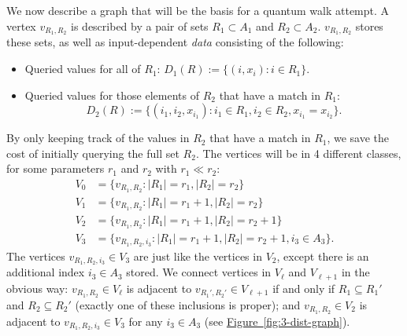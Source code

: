 \documentclass{article}
\newcommand{\fig}[1]{\hyperref[fig:#1]{Figure~\ref*{fig:#1}}}
\renewcommand{\>}{\rangle}
\newcommand{\<}{\langle}
\renewcommand{\(}{\left(}
\renewcommand{\)}{\right)}
\begin{document}
We now describe a graph that will be the basis for a quantum walk attempt. A vertex $v_{R_1,R_2}$ is described by a pair of sets $R_1\subset A_1$ and $R_2\subset A_2$.  $v_{R_1,R_2}$ stores these sets, as well as input-dependent \emph{data} consisting of the following:
\begin{itemize}
\item Queried values for all of $R_1$: $D_1(R):=\{(i,x_i):i\in R_1\}$.
\item Queried values for those elements of $R_2$ that have a match in $R_1$:
\[D_2(R):=\{(i_1,i_2,x_{i_1}): i_1\in R_1, i_2\in R_2, x_{i_1}=x_{i_2}\}.\]
\end{itemize}By only keeping track of the values in $R_2$ that have a match in $R_1$, we save the cost of initially querying the full set $R_2$.
The vertices will be in 4 different classes, for some parameters $r_1$ and $r_2$ with $r_1\ll r_2$:
\begin{align*}
V_0 &=\{v_{R_1,R_2}: |R_1|=r_1, |R_2|=r_2\}\\
V_1 &= \{v_{R_1,R_2}: |R_1|=r_1+1, |R_2|=r_2\}\\
V_2 &= \{v_{R_1,R_2}: |R_1|=r_1+1, |R_2|=r_2+1\}\\
V_3 &= \{v_{R_1,R_2,i_3}: |R_1|=r_1+1, |R_2|=r_2+1, i_3\in A_3\}.
\end{align*}
The vertices $v_{R_1,R_2,i_3}\in V_3$ are just like the vertices in $V_2$, except there is an additional index $i_3\in A_3$ stored. We connect vertices in $V_{\ell}$ and $V_{\ell+1}$ in the obvious way: $v_{R_1,R_2}\in V_{\ell}$ is adjacent to $v_{R_1',R_2'}\in V_{\ell+1}$ if and only if $R_1\subseteq R_1'$ and $R_2\subseteq R_2'$ (exactly one of these inclusions is proper); and $v_{R_1,R_2}\in V_2$ is adjacent to $v_{R_1,R_2,i_3}\in V_3$ for any $i_3\in A_3$ (see \fig{3-dist-graph}).
\end{document}
